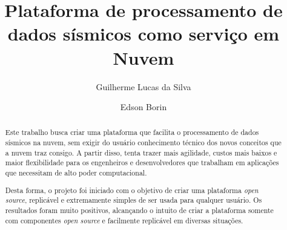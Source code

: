 \documentclass[11pt,twoside]{article}
\begin{document}
% 

%



\TRMakeCover


%
\pagestyle{myheadings}

%
\title{Plataforma de processamento de dados sísmicos como serviço em Nuvem}

\author{Guilherme Lucas da Silva \and Edson Borin}

\date{}

\maketitle


\begin{abstract} 
  Este trabalho busca criar uma plataforma que facilita o 
  processamento de dados sísmicos na nuvem, sem exigir do usuário conhecimento técnico dos
  novos conceitos que a nuvem traz consigo. A partir disso, tenta trazer
  mais agilidade, custos mais baixos e maior flexibilidade para os 
  engenheiros e desenvolvedores que trabalham em aplicações que 
  necessitam de alto poder computacional.

  Desta forma, o projeto foi iniciado com o objetivo de criar uma plataforma
  \emph{open source}, replicável e extremamente simples de ser usada para qualquer 
  usuário. Os resultados foram muito positivos, alcançando o intuito de criar
  a plataforma somente com componentes \emph{open source} e facilmente replicável em
  diversas situações.
\end{abstract}
\end{document}
